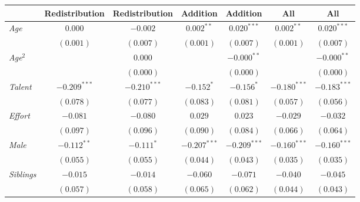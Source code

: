 
\begin{table}[H]
\begin{center}
\begin{footnotesize}
\begin{tabular}{l c c c c c c}
\toprule
 & Redistribution & Redistribution & Addition & Addition & All & All \\
\midrule
\textit{Age}                                  & $0.000$        & $-0.002$       & $0.002^{**}$   & $0.020^{***}$  & $0.002^{**}$   & $0.020^{***}$  \\
                                              & $(0.001)$      & $(0.007)$      & $(0.001)$      & $(0.007)$      & $(0.001)$      & $(0.007)$      \\
\textit{Age}$^2$                              &                & $0.000$        &                & $-0.000^{**}$  &                & $-0.000^{**}$  \\
                                              &                & $(0.000)$      &                & $(0.000)$      &                & $(0.000)$      \\
\textit{Talent}                               & $-0.209^{***}$ & $-0.210^{***}$ & $-0.152^{*}$   & $-0.156^{*}$   & $-0.180^{***}$ & $-0.183^{***}$ \\
                                              & $(0.078)$      & $(0.077)$      & $(0.083)$      & $(0.081)$      & $(0.057)$      & $(0.056)$      \\
\textit{Effort}                               & $-0.081$       & $-0.080$       & $0.029$        & $0.023$        & $-0.029$       & $-0.032$       \\
                                              & $(0.097)$      & $(0.096)$      & $(0.090)$      & $(0.084)$      & $(0.066)$      & $(0.064)$      \\
\textit{Male}                                 & $-0.112^{**}$  & $-0.111^{*}$   & $-0.207^{***}$ & $-0.209^{***}$ & $-0.160^{***}$ & $-0.160^{***}$ \\
                                              & $(0.055)$      & $(0.055)$      & $(0.044)$      & $(0.043)$      & $(0.035)$      & $(0.035)$      \\
\textit{Siblings}                             & $-0.015$       & $-0.014$       & $-0.060$       & $-0.071$       & $-0.040$       & $-0.045$       \\
                                              & $(0.057)$      & $(0.058)$      & $(0.065)$      & $(0.062)$      & $(0.044)$      & $(0.043)$      \\

\end{tabular}
\end{footnotesize}
\end{center}
\end{table}
